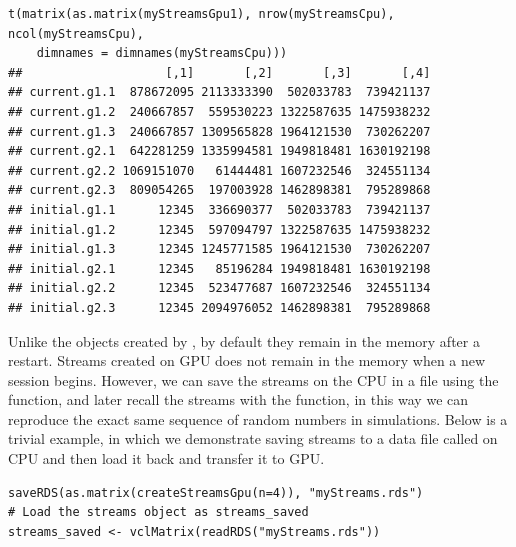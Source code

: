 \documentclass[article,nojss]{jss}\usepackage[]{graphicx}\usepackage[]{color}
\makeatletter
\newenvironment{kframe}{%
 \def\at@end@of@kframe{}%
 \ifinner\ifhmode%
  \def\at@end@of@kframe{\end{minipage}}%
  \begin{minipage}{\columnwidth}%
 \fi\fi%
 \def\FrameCommand##1{\hskip\@totalleftmargin \hskip-\fboxsep
 \colorbox{shadecolor}{##1}\hskip-\fboxsep
     \hskip-\linewidth \hskip-\@totalleftmargin \hskip\columnwidth}%
 \MakeFramed {\advance\hsize-\width
   \@totalleftmargin\z@ \linewidth\hsize
   \@setminipage}}%
 {\par\unskip\endMakeFramed%
 \at@end@of@kframe}
\newenvironment{knitrout}{}{} %
\newcommand{\fct}[1]{\code{#1()}}
\makeatother
\begin{document}
\begin{knitrout}
\color{fgcolor}\begin{kframe}
\begin{verbatim}
t(matrix(as.matrix(myStreamsGpu1), nrow(myStreamsCpu), ncol(myStreamsCpu),
    dimnames = dimnames(myStreamsCpu)))
##                    [,1]       [,2]       [,3]       [,4]
## current.g1.1  878672095 2113333390  502033783  739421137
## current.g1.2  240667857  559530223 1322587635 1475938232
## current.g1.3  240667857 1309565828 1964121530  730262207
## current.g2.1  642281259 1335994581 1949818481 1630192198
## current.g2.2 1069151070   61444481 1607232546  324551134
## current.g2.3  809054265  197003928 1462898381  795289868
## initial.g1.1      12345  336690377  502033783  739421137
## initial.g1.2      12345  597094797 1322587635 1475938232
## initial.g1.3      12345 1245771585 1964121530  730262207
## initial.g2.1      12345   85196284 1949818481 1630192198
## initial.g2.2      12345  523477687 1607232546  324551134
## initial.g2.3      12345 2094976052 1462898381  795289868
\end{verbatim}
\end{kframe}
\end{knitrout}
Unlike the objects created by , by default they remain in the memory after a restart. Streams created on GPU does not remain in the memory when a new  session begins. However, we can save the streams on the CPU in a file using the \fct{saveRDS} function, and later recall the streams with the \fct{readRDS} function, in this way we can reproduce the exact same sequence of random numbers in simulations. Below is a trivial example, in which we demonstrate saving streams to a data file called  on CPU and then load it back and transfer it to GPU.
\begin{knitrout}
\color{fgcolor}\begin{kframe}
\begin{verbatim}
saveRDS(as.matrix(createStreamsGpu(n=4)), "myStreams.rds")
# Load the streams object as streams_saved
streams_saved <- vclMatrix(readRDS("myStreams.rds"))
\end{verbatim}
\end{kframe}
\end{knitrout}
\end{document}
